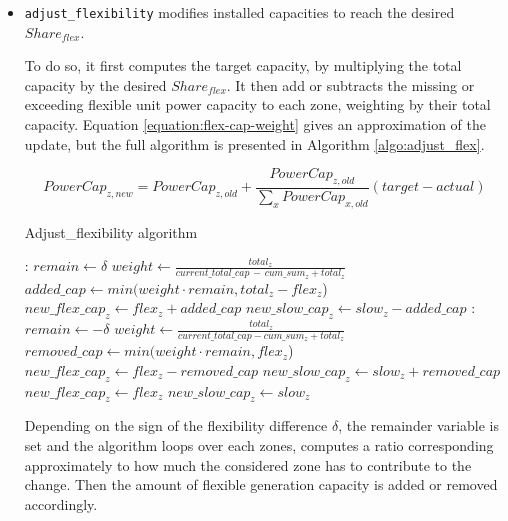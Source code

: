 \begin{itemize}
    \item \texttt{adjust\_flexibility} modifies installed capacities to reach the desired $Share_{flex}$.
    
    To do so, it first computes the target capacity, by multiplying the total capacity by the desired $Share_{flex}$. It then add or subtracts the missing or exceeding flexible unit power capacity to each zone, weighting by their total capacity. Equation \ref{equation:flex-cap-weight} gives an approximation of the update, but the full algorithm is presented in Algorithm \ref{algo:adjust_flex}.

    \begin{equation}
        PowerCap_{z,new} = PowerCap_{z,old} + \frac{PowerCap_{z,old}}{\sum_x PowerCap_{x,old}} (target-actual)
        \label{equation:flex-cap-weight}
    \end{equation}

    \begin{algorithm}[h]
        \caption{Adjust\_flexibility algorithm} \label{algo:adjust_flex}
        \begin{algorithmic}[1]
            : 
                \State $remain \gets \delta$
                \State $weight \gets \frac{total_{z}}{current\_total\_cap \, - \, cum\_sum_{z}+total_{z}}$
                \State $added\_cap \gets min (weight \cdot remain, total_{z} - flex_{z}$)
                \State $new\_flex\_cap_{z} \gets flex_{z} + added\_cap$
                \State $new\_slow\_cap_{z} \gets slow_{z} - added\_cap$
                \EndFor
            : 
                \State $remain \gets - \delta$
                \State $weight \gets \frac{total_{z}}{current\_total\_cap-cum\_sum_{z}+total_{z}}$
                \State $removed\_cap \gets min (weight \cdot remain, flex_{z}$)
                \State $new\_flex\_cap_{z} \gets flex_{z} - removed\_cap$
                \State $new\_slow\_cap_{z} \gets slow_{z} + removed\_cap$
                \EndFor
            \Else
            \State $new\_flex\_cap_{z} \gets flex_{z}$
            \State $new\_slow\_cap_{z} \gets slow_{z}$
            \EndIf
        \end{algorithmic}
    \end{algorithm}

    Depending on the sign of the flexibility difference $\delta$, the remainder variable is set and the algorithm loops over each zones, computes a ratio corresponding approximately to how much the considered zone has to contribute to the change. Then the amount of flexible generation capacity is added or removed accordingly.


\end{itemize}
